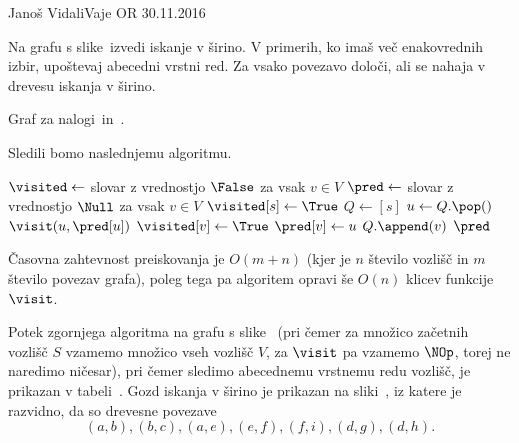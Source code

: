 
\begin{naloga}{Janoš Vidali}{Vaje OR 30.11.2016}
\begin{vprasanje}
Na grafu s slike~\fig izvedi iskanje v širino.
V primerih, ko imaš več ena\-ko\-vred\-nih izbir,
upoštevaj abecedni vrstni red.
Za vsako povezavo določi, ali se nahaja v drevesu iskanja v širino.

\begin{slika}
\pgfslika
\caption{Graf za nalogi~\nal in~\nal[dfs].}
\end{slika}
\end{vprasanje}

\begin{odgovor}
Sledili bomo naslednjemu algoritmu.
\begin{small}
\begin{algorithmic}
    \State $\visited \gets$ slovar z vrednostjo $\False$ za vsak $v \in V$
    \State $\pred \gets$ slovar z vrednostjo $\Null$ za vsak $v \in V$
		\If{$\lnot \visited[s]$}
			\State $\visited[s] \gets \True$
			\State $Q \gets [s]$
				\State $u \gets Q.\pop()$
                \State $\visit(u, \pred[u])$
					\If{$\lnot \visited[v]$}
						\State $\visited[v] \gets \True$
						\State $\pred[v] \gets u$
						\State $Q.\append(v)$
					\EndIf
				\EndFor
			\EndWhile
		\EndIf
	\EndFor
    \State \Return $\pred$
\EndFunction
\end{algorithmic}
\end{small}
Časovna zahtevnost preiskovanja je $O(m + n)$
(kjer je $n$ število vozlišč in $m$ število povezav grafa),
poleg tega pa algoritem opravi še $O(n)$ klicev funkcije $\visit$.

Potek zgornjega algoritma na grafu s slike~\fig
(pri čemer za množico začetnih vozlišč $S$
vzamemo množico vseh vozlišč $V$,
za $\visit$ pa vzamemo $\NOp$, torej ne naredimo ničesar),
pri čemer sledimo abecednemu vrstnemu redu vozlišč,
je prikazan v tabeli~\tab.
Gozd iskanja v širino je prikazan na sliki~,
iz katere je razvidno, da so drevesne povezave
$$
(a, b), (b, c), (a, e), (e, f), (f, i), (d, g), (d, h).
$$


\end{odgovor}
\end{naloga}

